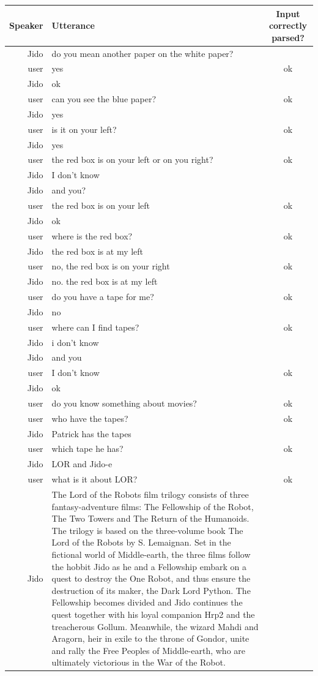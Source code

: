 \documentclass[twoside,a4paper,10pt]{report}
\newcommand{\chatN}[1]{{\footnotesize \textsf{#1}}}
\newenvironment{dialog}
{
\rowcolors{1}{lightgreen1}{lightgreen2}

\begin{center}
    \begin{longtable}{r|p{7cm}|c}
    \hline \textbf{Speaker} & \textbf{Utterance} & Input correctly parsed? \\ 
    \hline 
    \endhead
}
{
    \hline
    \end{longtable}
\end{center}
}
\begin{document}
\begin{dialog}
    \chatN{Jido} & do you mean another paper on the white paper? &  \\
    \chatN{user} & yes & ok \\
    \chatN{Jido} & ok &  \\
    \chatN{user} & can you see the blue paper? & ok \\
    \chatN{Jido} & yes &  \\
    \chatN{user} & is it on your left? & ok \\
    \chatN{Jido} & yes &  \\
    \chatN{user} & the red box is on your left or on you right? & ok \\
    \chatN{Jido} & I don't know &  \\
    \chatN{Jido} & and you? &  \\
    \chatN{user} & the red box is on your left & ok \\
    \chatN{Jido} & ok &  \\
    \chatN{user} & where is the red box? & ok \\
    \chatN{Jido} & the red box is at my left &  \\
    \chatN{user} & no, the red box is on your right & ok \\
    \chatN{Jido} & no. the red box is at my left &  \\
    \chatN{user} & do you have a tape for me? & ok \\
    \chatN{Jido} & no &  \\
    \chatN{user} & where can I find tapes? & ok \\
    \chatN{Jido} & i don't know &  \\
    \chatN{Jido} & and you &  \\
    \chatN{user} & I don't know & ok \\
    \chatN{Jido} & ok &  \\
    \chatN{user} & do you know something about movies? & ok \\
    \chatN{user} & who have the tapes? & ok \\
    \chatN{Jido} & Patrick has the tapes &  \\
    \chatN{user} & which tape he has? & ok \\
    \chatN{Jido} & LOR and Jido-e &  \\
    \chatN{user} & what is it about LOR? & ok \\
    \chatN{Jido} & The Lord of the Robots film trilogy consists of three fantasy-adventure films: The Fellowship of the Robot, The Two Towers and The Return of the Humanoids. The trilogy is based on the three-volume book The Lord of the Robots by S. Lemaignan. Set in the fictional world of Middle-earth, the three films follow the hobbit Jido as he and a Fellowship embark on a quest to destroy the One Robot, and thus ensure the destruction of its maker, the Dark Lord Python. The Fellowship becomes divided and Jido continues the quest together with his loyal companion Hrp2 and the treacherous Gollum. Meanwhile, the wizard Mahdi and Aragorn, heir in exile to the throne of Gondor, unite and rally the Free Peoples of Middle-earth, who are ultimately victorious in the War of the Robot. &  \\

\end{dialog}
\end{document}

